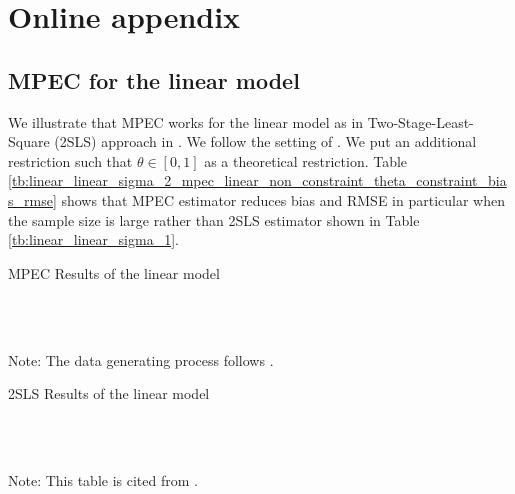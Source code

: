 \documentclass[11pt, a4paper]{article}
\begin{document}



\newpage
\appendix

\section{Online appendix}\label{sec:appendix}

\subsection{MPEC for the linear model}

We illustrate that MPEC works for the linear model as in Two-Stage-Least-Square (2SLS) approach in \cite{matsumura2023revisiting}. 
We follow the setting of \cite{matsumura2023revisiting}.
We put an additional restriction such that $\theta\in[0,1]$ as a theoretical restriction. 
Table \ref{tb:linear_linear_sigma_2_mpec_linear_non_constraint_theta_constraint_bias_rmse} shows that MPEC estimator reduces bias and RMSE in particular when the sample size is large rather than 2SLS estimator shown in Table \ref{tb:linear_linear_sigma_1}.

\begin{table}[!htbp]
  \begin{center}
      \caption{MPEC Results of the linear model}
      \label{tb:linear_linear_sigma_2_mpec_linear_non_constraint_theta_constraint_bias_rmse} 
      \subfloat[$\sigma=0.001$]{}\\
      \subfloat[$\sigma=0.5$]{}\\
    \subfloat[$\sigma=2.0$]{}
  \end{center}
  \footnotesize
  Note: The data generating process follows \cite{matsumura2023revisiting}.
\end{table} 


\begin{table}[!htbp]
  \begin{center}
      \caption{2SLS Results of the linear model}
      \label{tb:linear_linear_sigma_1} 
      \subfloat[$\sigma=0.001$]{}\\
      \subfloat[$\sigma=0.5$]{}\\
    \subfloat[$\sigma=2.0$]{}
  \end{center}
  \footnotesize
  Note: This table is cited from \cite{matsumura2023revisiting}.
\end{table} 
\end{document}
